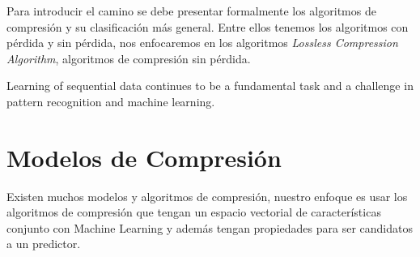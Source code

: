 Para introducir el camino se debe presentar formalmente los algoritmos de compresión y su clasificación más general. Entre ellos tenemos los algoritmos con pérdida y sin pérdida, nos enfocaremos en los algoritmos \emph{Lossless Compression Algorithm}, algoritmos de compresión sin pérdida.





Learning of sequential data continues to be a fundamental task and a challenge in pattern recognition and machine learning.










\section{Modelos de Compresión}


Existen muchos modelos y algoritmos de compresión, nuestro enfoque es usar los algoritmos de compresión que tengan un espacio vectorial de características conjunto con Machine Learning y además tengan propiedades para ser candidatos a un predictor. 







